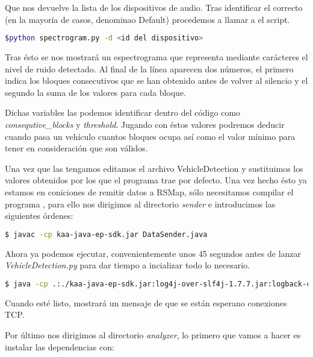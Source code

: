 Que nos devuelve la lista de los dispositivos de audio. Tras identificar el correcto (en la mayoría de casos, denominao Default) procedemos a llamar a el script.

\begin{lstlisting}[language=bash,caption={Ejecutar la aplicación de configuración},label={lst:pi1}]
$python spectrogram.py -d <id del dispositivo>
\end{lstlisting}

Tras ésto se nos mostrará un espectrograma que representa mediante carácteres el nivel de ruido detectado. Al final de la línea aparecen dos números, el primero indica los bloques consecutivos que se han obtenido antes de volver al silencio y el segundo la suma de los valores para cada bloque.

Dichas variables las podemos identificar dentro del código como
\textit{consequtive_blocks} y \textit{threshold}. Jugando con éstos valores podremos deducir cuando pasa un vehículo cuantos bloques ocupa así como el valor mínimo para tener en consideración que son válidos.

\bigskip

Una vez que las tengamos editamos el archivo VehicleDetection y sustituimos los valores obtenidos por los que el programa trae por defecto. Una vez hecho ésto ya estamos en coniciones de remitir datos a RSMap, sólo necesitamos compilar el programa , para ello nos dirigimos al directorio \textit{sender} e introducimos las siguientes órdenes:

\begin{lstlisting}[language=bash,caption={Compilar DataSender.java},label={lst:pi1}]
$ javac -cp kaa-java-ep-sdk.jar DataSender.java
\end{lstlisting}

Ahora ya podemos ejecutar, convenientemente unos 45 segundos antes de lanzar \textit{VehicleDetection.py} para dar tiempo a incializar todo lo necesario.

\begin{lstlisting}[language=bash,caption={Lanzar DataSender},label={lst:pi1}]
$ java -cp .:./kaa-java-ep-sdk.jar:log4j-over-slf4j-1.7.7.jar:logback-classic-1.1.2.jar:logback-core-1.1.2.jar DataSender
\end{lstlisting}

Cuando esté listo, mostrará un mensaje de que se están esperano conexiones TCP.

Por último nos dirigimos al directorio \textit{analyzer}, lo primero que vamos a hacer es instalar las dependencias con:

